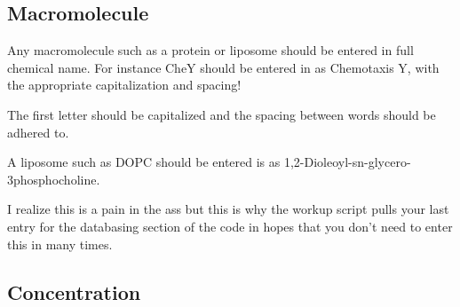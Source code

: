 \documentclass[10pt]{book}
\begin{document}
\subsection{Macromolecule}
Any macromolecule such as a protein or liposome should be entered in full chemical name. For instance CheY should be entered in as Chemotaxis Y, with the appropriate capitalization and spacing!

The first letter should be capitalized and the spacing between words should be adhered to.

A liposome such as DOPC should be entered is as 1,2-Dioleoyl-sn-glycero-3phosphocholine. 

I realize this is a pain in the ass but this is why the workup script pulls your last entry for the databasing section of the code in hopes that you don't need to enter this in many times.

\subsection{Concentration}
\end{document}
